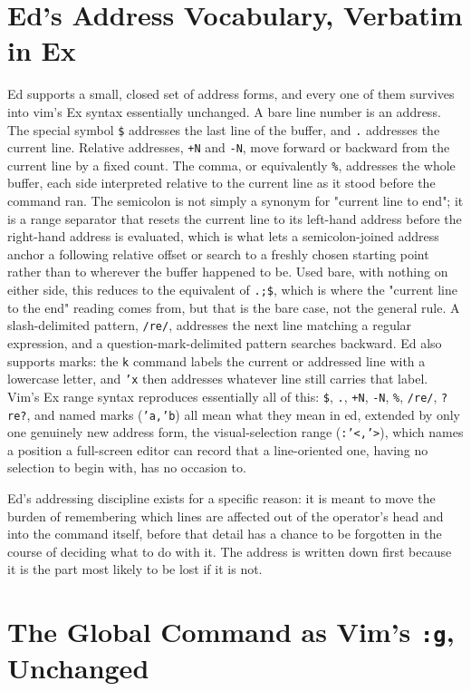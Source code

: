 \documentclass[11pt]{article}
\begin{document}
\section{Ed's Address Vocabulary, Verbatim in Ex}

Ed supports a small, closed set of address forms, and every one of them survives into vim's Ex syntax essentially unchanged. A bare line number is an address. The special symbol \texttt{\$} addresses the last line of the buffer, and \texttt{.} addresses the current line. Relative addresses, \texttt{+N} and \texttt{-N}, move forward or backward from the current line by a fixed count. The comma, or equivalently \texttt{\%}, addresses the whole buffer, each side interpreted relative to the current line as it stood before the command ran. The semicolon is not simply a synonym for "current line to end"; it is a range separator that resets the current line to its left-hand address before the right-hand address is evaluated, which is what lets a semicolon-joined address anchor a following relative offset or search to a freshly chosen starting point rather than to wherever the buffer happened to be. Used bare, with nothing on either side, this reduces to the equivalent of \texttt{.;\$}, which is where the "current line to the end" reading comes from, but that is the bare case, not the general rule. A slash-delimited pattern, \texttt{/re/}, addresses the next line matching a regular expression, and a question-mark-delimited pattern searches backward. Ed also supports marks: the \texttt{k} command labels the current or addressed line with a lowercase letter, and \texttt{'x} then addresses whatever line still carries that label. Vim's Ex range syntax reproduces essentially all of this: \texttt{\$}, \texttt{.}, \texttt{+N}, \texttt{-N}, \texttt{\%}, \texttt{/re/}, \texttt{?re?}, and named marks (\texttt{'a,'b}) all mean what they mean in ed, extended by only one genuinely new address form, the visual-selection range (\texttt{:'<,'>}), which names a position a full-screen editor can record that a line-oriented one, having no selection to begin with, has no occasion to.

Ed's addressing discipline exists for a specific reason: it is meant to move the burden of remembering which lines are affected out of the operator's head and into the command itself, before that detail has a chance to be forgotten in the course of deciding what to do with it. The address is written down first because it is the part most likely to be lost if it is not.

\section{The Global Command as Vim's \texttt{:g}, Unchanged}
\end{document}
